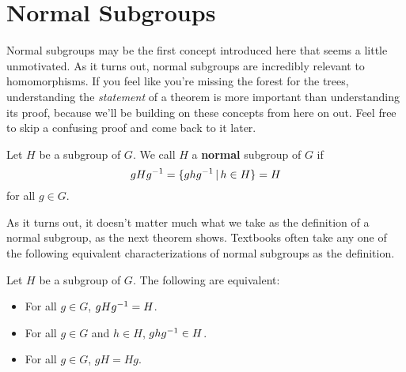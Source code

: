 \section{Normal Subgroups}

Normal subgroups may be the first concept introduced here that seems a little unmotivated. As it turns out, normal subgroups are incredibly relevant to homomorphisms. If you feel like you're missing the forest for the trees, understanding the \textit{statement} of a theorem is more important than understanding its proof, because we'll be building on these concepts from here on out. Feel free to skip a confusing proof and come back to it later.

\begin{definition}
Let $H$ be a subgroup of $G$. We call $H$ a \textbf{normal} subgroup of $G$ if
\begin{equation*}
    gHg^{-1} = \{ghg^{-1} \,|\, h \in H\} = H
\end{equation*}
for all $g \in G$.
\end{definition}

As it turns out, it doesn't matter much what we take as the definition of a normal subgroup, as the next theorem shows. Textbooks often take any one of the following equivalent characterizations of normal subgroups as the definition.

\begin{theorem}
\label{normaldefs}
Let $H$ be a subgroup of $G$. The following are equivalent:
\begin{itemize}
\item For all $g \in G$, $gHg^{-1} = H$.
\item For all $g \in G$ and $h \in H$, $ghg^{-1} \in H$.
\item For all $g \in G$, $gH = Hg$.
\end{itemize}
\end{theorem}

